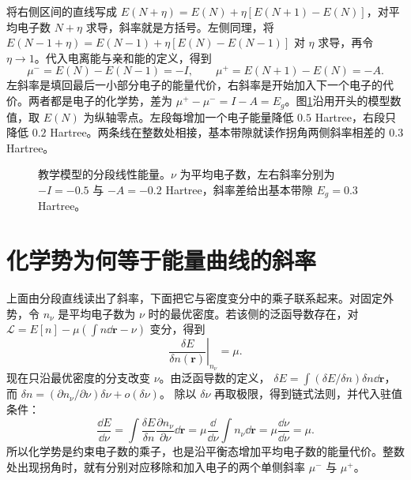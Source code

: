 将右侧区间的直线写成 $E(N+\eta)=E(N)+\eta[E(N+1)-E(N)]$，对平均电子数 $N+\eta$ 求导，斜率就是方括号。左侧同理，将 $E(N-1+\eta)=E(N-1)+\eta[E(N)-E(N-1)]$ 对 $\eta$ 求导，再令 $\eta\to1$。代入电离能与亲和能的定义，得到
\begin{equation}\label{spectra:slopes}
\mu^-=E(N)-E(N-1)=-I,\qquad
\mu^+=E(N+1)-E(N)=-A.
\end{equation}
左斜率是填回最后一小部分电子的能量代价，右斜率是开始加入下一个电子的代价。两者都是电子的化学势，差为 $\mu^+-\mu^-=I-A=E_g$。图\ref{spectra:piecewise-figure}沿用开头的模型数值，取 $E(N)$ 为纵轴零点。左段每增加一个电子能量降低 $0.5$ Hartree，右段只降低 $0.2$ Hartree。两条线在整数处相接，基本带隙就读作拐角两侧斜率相差的 $0.3$ Hartree。

\begin{figure}[htbp]
\centering

\caption{教学模型的分段线性能量。$\nu$ 为平均电子数，左右斜率分别为 $-I=-0.5$ 与 $-A=-0.2$ Hartree，斜率差给出基本带隙 $E_g=0.3$ Hartree。}
\label{spectra:piecewise-figure}
\end{figure}

\section{化学势为何等于能量曲线的斜率}
上面由分段直线读出了斜率，下面把它与密度变分中的乘子联系起来。对固定外势，令 $n_\nu$ 是平均电子数为 $\nu$ 时的最优密度。若该侧的泛函导数存在，对
$\mathcal L=E[n]-\mu(\int n\dd\bm r-\nu)$ 变分，得到
\begin{equation}
\left.\frac{\delta E}{\delta n(\bm r)}\right|_{n_\nu}=\mu.
\end{equation}
现在只沿最优密度的分支改变 $\nu$。由泛函导数的定义，
$\delta E=\int(\delta E/\delta n)\delta n\dd\bm r$，而
$\delta n=(\partial n_\nu/\partial\nu)\delta\nu+o(\delta\nu)$。
除以 $\delta\nu$ 再取极限，得到链式法则，并代入驻值条件：
\begin{equation}\label{spectra:chemical-potential}
\frac{\dd E}{\dd\nu}
=\int\frac{\delta E}{\delta n}\frac{\partial n_\nu}{\partial\nu}\dd\bm r
=\mu\frac{\dd}{\dd\nu}\int n_\nu\dd\bm r
=\mu\frac{\dd\nu}{\dd\nu}=\mu.
\end{equation}
所以化学势是约束电子数的乘子，也是沿平衡态增加平均电子数的能量代价。整数处出现拐角时，就有分别对应移除和加入电子的两个单侧斜率 $\mu^-$ 与 $\mu^+$。

